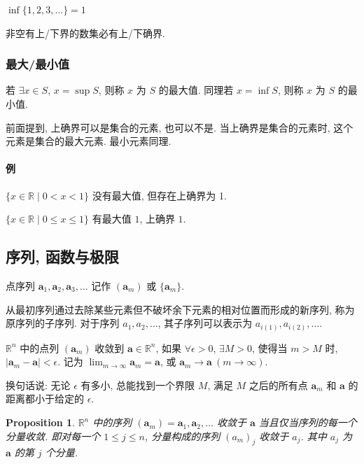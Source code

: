 \documentclass[UTF8]{ctexart}
\newtheorem{proposition}{Proposition}[section]
\newcommand{\ve}[1]{\boldsymbol{\mathbf{#1}}}
\newcommand{\R}{\mathbb R}
\begin{document}
$ \inf\{1,2,3,\dots \}=1 $


\begin{theorem} 
    非空有上/下界的数集必有上/下确界.
\end{theorem}

\subsubsection{最大/最小值}
\begin{definition}
    若 $ \exists x \in S $, $ x = \sup S $, 则称 $ x $ 为 $ S $ 的最大值. 同理若 $ x = \inf S $, 则称 $ x $ 为 $ S $ 的最小值.
\end{definition}

前面提到, 上确界可以是集合的元素, 也可以不是. 当上确界是集合的元素时, 这个元素是集合的最大元素. 最小元素同理.
\paragraph{例}
$ \{ x \in \R \mid 0 < x < 1 \} $ 没有最大值, 但存在上确界为 1.

$ \{ x \in \R \mid 0 \leqslant x \leqslant 1 \} $ 有最大值 $ 1 $, 上确界 $ 1 $.

\subsection{序列, 函数与极限}
点序列 $ \ve a_1, \ve a_2, \ve a_3, \dots $ 记作 $ (\ve a_m) $ 或 $ \{ \ve a_m \} $.

从最初序列通过去除某些元素但不破坏余下元素的相对位置而形成的新序列, 称为原序列的子序列. 对于序列 $ a_1, a_2, \dots $, 其子序列可以表示为 $ a_{i(1)}, a_{i(2)}, \dots $. 

\begin{definition}
    $ \R^n $ 中的点列 $ (\ve a_m) $ 收敛到 $ \ve a \in \R^n $, 如果 $ \forall \epsilon > 0 $, $ \exists M > 0 $, 使得当 $ m > M $ 时, $ |\ve a_m - \ve a| < \epsilon $. 记为 $\displaystyle \lim_{m \to \infty} \ve a_m = \ve a $, 或 $ \ve a_m \to \ve a\ (m \to \infty) $.
\end{definition}

换句话说: 无论 $ \epsilon $ 有多小, 总能找到一个界限 $ M $, 满足 $ M $ 之后的所有点 $ \ve a_m $ 和 $ \ve a $ 的距离都小于给定的 $ \epsilon $. 

\begin{proposition}
    $ \R^n $ 中的序列 $ (\ve a_m) = \ve a_1, \ve a_2, \dots $ 收敛于 $ \ve a $ 当且仅当序列的每一个分量收敛. 即对每一个 $ 1 \leqslant j \leqslant n $, 分量构成的序列 $ (a_m)_j $ 收敛于 $ a_j $. 其中 $ a_j $ 为 $ \ve a $ 的第 $ j $ 个分量.
\end{proposition}
\end{document}
